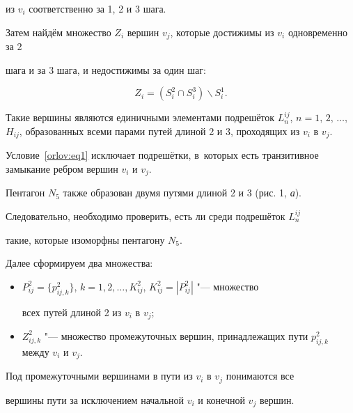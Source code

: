 из $v_{i}$ соответственно за 1, 2 и 3 шага. 

Затем найдём множество $Z_i $ вершин $v_j$, которые достижимы из $v_i$ одновременно за 2

шага и за 3 шага, и недостижимы за один шаг:

\begin{equation}

\label{orlov:eq1}

Z_i =(S_i^2 \cap S_i^3)\backslash S_i^1.

\end{equation}



Такие вершины являются единичными элементами подрешёток $L_n^{ij}$, $n=1,\, 2, \, \ldots,$ $H_{ij}$, образованных всеми парами путей длиной 2 и 3, проходящих из $v_i$ в $v_j$. 

Условие~\eqref{orlov:eq1} исключает подрешётки, в~которых есть транзитивное замыкание ребром вершин $v_i$ и $v_j$.



Пентагон $N_5$ также образован двумя путями длиной 2 и 3 (рис. 1, {\sl а}).

Следовательно, необходимо проверить, есть ли среди подрешёток $L_n^{ij} $

такие, которые изоморфны пентагону $ N_5$.



Далее сформируем два множества:

\begin{itemize}





\item $P_{ij}^2 =\{ p_{ij, k}^2 \}$, $k=1, 2, \ldots, K_{ij}^2$, $K_{ij}^2 =| P_{ij}^2  |$ "--- множество

всех путей длиной 2 из $v_i$ в $v_j$;



\item $Z_{ij,k}^2 $ "--- множество промежуточных вершин, принадлежащих пути $p_{ij,k}^2 $ между $v_i$ и $v_j$.





\end{itemize}



Под промежуточными вершинами в пути из $v_i$ в $v_j$ понимаются все

вершины пути за исключением начальной $v_i$ и конечной $v_j$ вершин.




